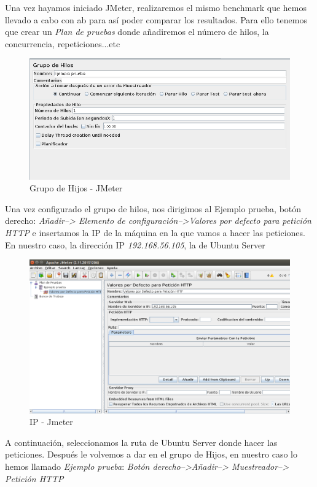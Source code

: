 \newpage

Una vez hayamos iniciado JMeter, realizaremos el mismo benchmark que hemos llevado a cabo con ab para así poder comparar los resultados. Para ello tenemos que crear un \textit{Plan de pruebas} donde añadiremos el número de hilos, la concurrencia, repeticiones...etc
	\begin{figure}[h]
		\centering
		\includegraphics[scale=0.35]{images/GHJ.png}
		\caption{Grupo de Hijos - JMeter}
	\end{figure}
	
Una vez configurado el grupo de hilos, nos dirigimos al Ejemplo prueba, botón derecho:
\textit{Añadir--> Elemento de configuración-->Valores por defecto para petición HTTP} e insertamos la IP de la máquina en la que vamos a hacer las peticiones. \\ En nuestro caso, la dirección IP \textit{192.168.56.105}, la de Ubuntu Server

\begin{figure}[h]
	\centering
	\includegraphics[scale=0.35]{images/IPJ.png}
	\caption{IP - Jmeter}
\end{figure}

\newpage
A continuación, seleccionamos la ruta de Ubuntu Server donde hacer las peticiones. 
Después le volvemos a dar en el grupo de Hijos, en nuestro caso lo hemos llamado \textit{Ejemplo prueba}:
\textit{Botón derecho-->Añadir--> Muestreador--> Petición HTTP}

